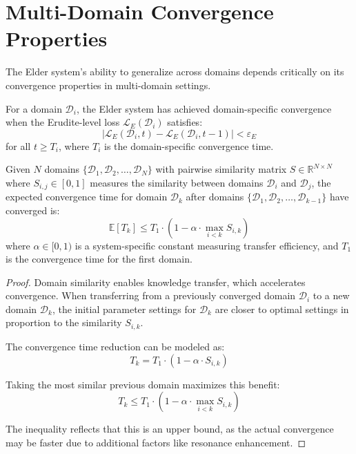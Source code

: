 \section{Multi-Domain Convergence Properties}

The Elder system's ability to generalize across domains depends critically on its convergence properties in multi-domain settings.

\begin{definition}
For a domain $\mathcal{D}_i$, the Elder system has achieved domain-specific convergence when the Erudite-level loss $\mathcal{L}_E(\mathcal{D}_i)$ satisfies:
\begin{equation}
|\mathcal{L}_E(\mathcal{D}_i, t) - \mathcal{L}_E(\mathcal{D}_i, t-1)| < \varepsilon_E
\end{equation}
for all $t \geq T_i$, where $T_i$ is the domain-specific convergence time.
\end{definition}

\begin{theorem}
Given $N$ domains $\{\mathcal{D}_1, \mathcal{D}_2, \ldots, \mathcal{D}_N\}$ with pairwise similarity matrix $S \in \mathbb{R}^{N \times N}$ where $S_{i,j} \in [0,1]$ measures the similarity between domains $\mathcal{D}_i$ and $\mathcal{D}_j$, the expected convergence time for domain $\mathcal{D}_k$ after domains $\{\mathcal{D}_1, \mathcal{D}_2, \ldots, \mathcal{D}_{k-1}\}$ have converged is:
\begin{equation}
\mathbb{E}[T_k] \leq T_1 \cdot \left(1 - \alpha \cdot \max_{i<k} S_{i,k} \right)
\end{equation}
where $\alpha \in [0,1)$ is a system-specific constant measuring transfer efficiency, and $T_1$ is the convergence time for the first domain.
\end{theorem}

\begin{proof}
Domain similarity enables knowledge transfer, which accelerates convergence. When transferring from a previously converged domain $\mathcal{D}_i$ to a new domain $\mathcal{D}_k$, the initial parameter settings for $\mathcal{D}_k$ are closer to optimal settings in proportion to the similarity $S_{i,k}$.

The convergence time reduction can be modeled as:
\begin{equation}
T_k = T_1 \cdot (1 - \alpha \cdot S_{i,k})
\end{equation}

Taking the most similar previous domain maximizes this benefit:
\begin{equation}
T_k \leq T_1 \cdot \left(1 - \alpha \cdot \max_{i<k} S_{i,k} \right)
\end{equation}

The inequality reflects that this is an upper bound, as the actual convergence may be faster due to additional factors like resonance enhancement.
\end{proof}

